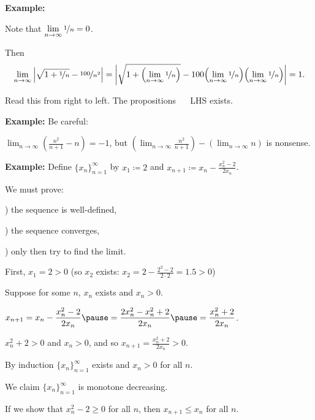 \documentclass[10pt,aspectratio=169]{beamer}
\begin{document}
\begin{frame}

\textbf{Example:}

Note that
$\lim\limits_{n\to\infty} \nicefrac{1}{n} = 0$.

\pause
Then
\begin{equation*}
\lim_{n\to \infty}
\left\lvert {\sqrt{1 + \nicefrac{1}{n}} - \nicefrac{100}{n^2}} \right\rvert =  
\left\lvert {\sqrt{1 + \Bigl(\lim_{n\to\infty} \nicefrac{1}{n}\Bigr)} -
100 \Bigl(\lim_{n\to\infty} \nicefrac{1}{n}\Bigr)\Bigl(\lim_{n\to\infty} \nicefrac{1}{n}\Bigr)} \right\rvert = 1.
\end{equation*}

\pause
Read this from right to left.  The propositions ~\thus~ LHS exists.

\pause
\medskip

\textbf{Example:}
Be careful:

\medskip

$\displaystyle
\lim_{n\to \infty} \left( \frac{n^2}{n+1} - n \right)
= -1$,
\quad
\pause
but
\quad
$\displaystyle \left(\lim_{n\to\infty} \frac{n^2}{n+1}\right) -
\left(\lim_{n\to\infty} n\right)$ is nonsense.

\end{frame}


\begin{frame}
\textbf{Example:}
Define $\{ x_n \}_{n=1}^\infty$ by $x_1 \coloneqq 2$ and
$\displaystyle x_{n+1} \coloneqq x_n - \frac{x_n^2-2}{2x_n}$.

\medskip
\pause

We must prove:

) the sequence is well-defined,

) the sequence converges,

) only then try to find the limit.

\medskip
\pause

First, $x_1 = 2 > 0$ (so $x_2$ exists: $x_2 = 2-\frac{2^2-2}{2\cdot 2} = 1.5
> 0$)

\medskip
\pause

Suppose for some $n$, $x_n$ exists and $x_n > 0$.

\medskip
\pause

$\displaystyle
x_{n+1} = x_n - \frac{x_n^2-2}{2x_n}
\pause
=
\frac{2x_n^2 - x_n^2+2}{2x_n}
\pause
=
\frac{x_n^2+2}{2x_n}$.

\medskip
\pause

$x_n^2+2 > 0$ and $x_n > 0$,
\pause
and so
$x_{n+1} = \frac{x_n^2+2}{2x_n} > 0$.

\medskip
\pause

By induction $\{ x_n \}_{n=1}^\infty$ exists and $x_n > 0$ for all $n$.

\medskip
\pause

We claim $\{ x_n \}_{n=1}^\infty$ is monotone decreasing.

\medskip
\pause

If we show that $x_n^2-2 \geq 0$ for all $n$, then $x_{n+1} \leq x_n$ for all $n$.

\end{frame}
\end{document}
